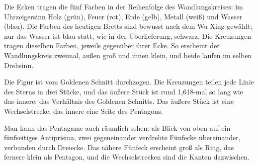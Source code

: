 \documentclass[12pt,paper=a5,DIV=13,headings=small,twoside=true,open=any]{scrbook}
\newlength{\normalparindent}
\newenvironment{einleitung}
  {\par\justifying\setlength{\parindent}{\normalparindent}\setlength{\parskip}{0pt}}
  {\par}
\begin{document}
\begin{einleitung}
Die Ecken tragen die fünf Farben in der Reihenfolge des Wandlungskreises: im Uhrzeigersinn Holz (grün), Feuer (rot), Erde (gelb), Metall (weiß) und Wasser (blau). Die Farben des heutigen Bretts sind bewusst nach dem Wu Xing gewählt; nur das Wasser ist blau statt, wie in der Überlieferung, schwarz. Die Kreuzungen tragen dieselben Farben, jeweils gegenüber ihrer Ecke. So erscheint der Wandlungskreis zweimal, außen groß und innen klein, und beide laufen im selben Drehsinn.

Die Figur ist vom Goldenen Schnitt durchzogen. Die Kreuzungen teilen jede Linie des Sterns in drei Stücke, und das äußere Stück ist rund 1,618-mal so lang wie das innere: das Verhältnis des Goldenen Schnitts. Das äußere Stück ist eine Wechselstrecke, das innere eine Seite des Pentagons.

Man kann das Pentagame auch räumlich sehen: als Blick von oben auf ein fünfseitiges Antiprisma, zwei gegeneinander verdrehte Fünfecke übereinander, verbunden durch Dreiecke. Das nähere Fünfeck erscheint groß als Ring, das fernere klein als Pentagon, und die Wechselstrecken sind die Kanten dazwischen.
\end{einleitung}
\end{document}
